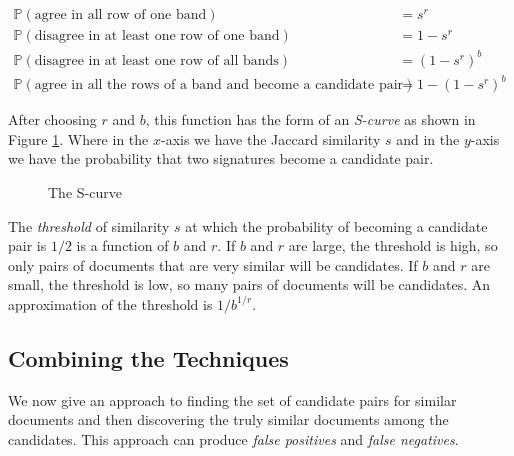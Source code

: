 \begin{equation*}
    \begin{split}
        \mathbb{P}(\text{agree in all row of one band}) & = s^r \\
        \mathbb{P}(\text{disagree in at least one row of one band}) & = 1 - s^r \\
        \mathbb{P}(\text{disagree in at least one row of all bands}) & = (1 - s^r)^b \\    
        \mathbb{P}(\text{agree in all the rows of a band and become a candidate pair}) & = 1 - (1 - s^r)^b
    \end{split}
\end{equation*}

After choosing $r$ and $b$, this function has the form of an \textit{S-curve} as shown in Figure \ref{fig:4-s-curve}. Where in the $x$-axis we have the Jaccard similarity $s$ and in the $y$-axis we have the probability that two signatures become a candidate pair. 

\begin{figure}[H]
\centering
\scalebox{1}{
    
}
\caption{The S-curve}
\label{fig:4-s-curve}
\end{figure}

The \textit{threshold} of similarity $s$ at which the probability of becoming a candidate pair is $1/2$ is a function of $b$ and $r$. If $b$ and $r$ are large, the threshold is high, so only pairs of documents that are very similar will be candidates. If $b$ and $r$ are small, the threshold is low, so many pairs of documents will be candidates. An approximation of the threshold is $1/b^{1/r}$.

\subsection{Combining the Techniques}\label{sec:combining-techniques}

We now give an approach to finding the set of candidate pairs for similar documents and then discovering the truly similar documents among the candidates. This approach can produce \textit{false positives} and \textit{false negatives}. 

